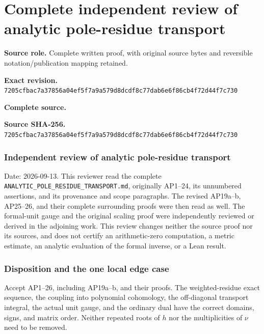 \begingroup

\section{Complete independent review of analytic pole-residue transport}


\begingroup
\sloppy
\small

\noindent\textbf{Source role.} Complete written proof, with original source bytes and reversible notation/publication mapping retained.\par
\noindent\textbf{Exact revision.} \nolinkurl{7205cfbac7a37856a04ef5f7a9a579d8dcdf8c77dab6e6f86cb4f72d44f7c730}\par
\noindent\textbf{Complete source.} \par
\noindent\textbf{Source SHA-256.} \nolinkurl{7205cfbac7a37856a04ef5f7a9a579d8dcdf8c77dab6e6f86cb4f72d44f7c730}\par\medskip
\subsubsection{Independent review of analytic pole-residue transport}\label{endpoint-analytic_pole_review--independent-review-of-analytic-pole-residue-transport}

Date: 2026-09-13. This reviewer read the complete \nolinkurl{ANALYTIC_POLE_RESIDUE_TRANSPORT.md}, originally AP1--24, its unnumbered assertions, and its provenance and scope paragraphs. The revised AP19a--b, AP25--26, and their complete surrounding proofs were then read as well. The formal-unit gauge and the original scaling proof were independently reviewed or derived in the adjoining work. This review changes neither the source proof nor its sources, and does not certify an arithmetic-zero computation, a metric estimate, an analytic evaluation of the formal inverse, or a Lean result.

\subsubsection{Disposition and the one local edge case}\label{endpoint-analytic_pole_review--disposition-and-the-one-local-edge-case}

Accept AP1--26, including AP19a--b, and their proofs. The weighted-residue exact sequence, the coupling into polynomial cohomology, the off-diagonal transport integral, the actual unit gauge, and the ordinary dual have the correct domains, signs, and matrix order. Neither repeated roots of \(h\) nor the multiplicities of \(\nu\) need to be removed.

